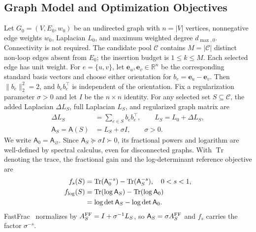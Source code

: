 \documentclass[conference]{IEEEtran}
\theoremstyle{definition}
\DeclareMathOperator{\Tr}{Tr}
\newcommand{\matA}{\mathsf A}
\begin{document}
\subsection{Graph Model and Optimization Objectives}
Let $G_0=(V,E_0,w_0)$ be an undirected graph with
$n=|V|$ vertices, nonnegative edge weights $w_0$, Laplacian
$L_0$, and maximum weighted degree $d_{\max,0}$. Connectivity
is not required. The candidate pool $\mathcal C$ contains
$M=|\mathcal C|$ distinct non-loop edges absent from $E_0$;
the insertion budget is $1\le k\le M$. Each selected edge has
unit weight. For $e=\{u,v\}$, let $\bm e_u,\bm e_v\in\mathbb R^n$
be the corresponding standard basis vectors and choose either
orientation for $b_e=\bm e_u-\bm e_v$. Then
$\|b_e\|_2^2=2$, and $b_eb_e^\top$ is independent of the
orientation. Fix a regularization parameter $\sigma>0$ and let $I$ be
the $n\times n$ identity. For any selected set
$S\subseteq\mathcal C$, the added Laplacian $\Delta L_S$, full Laplacian $L_S$, and
regularized graph matrix are
\begin{equation}
\begin{aligned}
\Delta L_S&=\sum_{e\in S}b_eb_e^\top,\qquad L_S=L_0+\Delta L_S,\\
\matA_S=\matA(S)&=L_S+\sigma I,\qquad \sigma>0.
\end{aligned}
\label{eq:matrix-model}
\end{equation}
We write $\matA_0=\matA_\varnothing$. Since $\matA_S\succeq\sigma I\succ0$,
its fractional powers and logarithm are well-defined by
spectral calculus, even for disconnected graphs. With $\Tr$
denoting the trace, the fractional gain and the
log-determinant reference objective are
\begin{align}
f_s(S)&=\Tr(\matA_0^{-s})-\Tr(\matA_S^{-s}),\quad 0<s<1,
\label{eq:fractional-objective}\\
f_{\log}(S)&=\Tr(\log \matA_S)-\Tr(\log \matA_0)\notag\\
&=\log\det \matA_S-\log\det \matA_0.
\label{eq:log-objective}
\end{align}
FastFrac~\cite{fastfrac} normalizes by
$A_S^{\rm FF}=I+\sigma^{-1}L_S$, so $\matA_S=\sigma A_S^{\rm FF}$
and $f_s$ carries the factor $\sigma^{-s}$.
\end{document}
